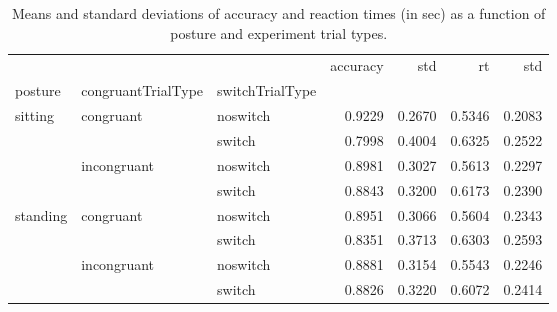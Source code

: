 \begin{table}
\centering
\caption{Means and standard deviations of accuracy and reaction times (in sec) as a function of posture and experiment trial types.}
\label{table-task-switching-replication-reaction-time}
\begin{tabular}{lllrrrr}
\toprule
         &             &        & accuracy &    std &     rt &    std \\
posture & congruantTrialType & switchTrialType &          &        &        &        \\
\midrule
sitting & congruant & noswitch &   0.9229 & 0.2670 & 0.5346 & 0.2083 \\
         &             & switch &   0.7998 & 0.4004 & 0.6325 & 0.2522 \\
         & incongruant & noswitch &   0.8981 & 0.3027 & 0.5613 & 0.2297 \\
         &             & switch &   0.8843 & 0.3200 & 0.6173 & 0.2390 \\
standing & congruant & noswitch &   0.8951 & 0.3066 & 0.5604 & 0.2343 \\
         &             & switch &   0.8351 & 0.3713 & 0.6303 & 0.2593 \\
         & incongruant & noswitch &   0.8881 & 0.3154 & 0.5543 & 0.2246 \\
         &             & switch &   0.8826 & 0.3220 & 0.6072 & 0.2414 \\
\bottomrule
\end{tabular}
\end{table}
